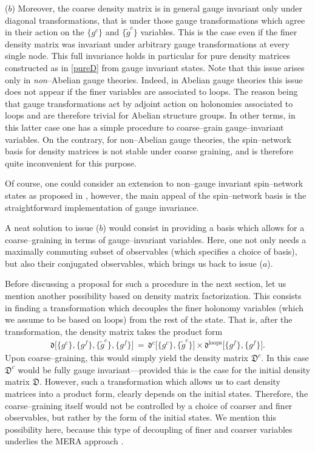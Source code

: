 \documentclass[nofootinbib,superscriptaddress,eqsecnum,tightenlines,11pt]{revtex4-1}
\def\ba{\begin{eqnarray}}
\def\ea{\end{eqnarray}}
\renewcommand{\tilde}{\widetilde}
\def\D{\mathfrak{D}}
\begin{document}
($b$) Moreover, the coarse density matrix is in general gauge invariant only under diagonal transformations, that is under those gauge transformations which agree in their action on the $\{g^c\}$ and $\{\tilde g^c\}$ variables. 
This is the  case even if the finer density matrix was invariant under arbitrary gauge transformations at every single node. 
This full invariance holds in particular for pure density matrices constructed as in \eqref{pureD} from gauge invariant states. 
Note that this issue arises only in \textit{non}--Abelian gauge theories.
Indeed, in Abelian gauge theories this issue does not appear if the finer variables are associated to loops. 
The reason being that gauge transformations  act by adjoint action on holonomies associated to loops and are therefore trivial for Abelian structure groups. 
In other terms, in this latter case one has a simple procedure to coarse--grain gauge--invariant variables.
On the contrary, for non--Abelian gauge theories, the spin--network basis for density matrices is not stable under coarse graining, and is therefore quite inconvenient for this purpose.

Of course, one could consider an extension to non--gauge invariant spin--network states as proposed in \cite{EteraCG,EteraTags}, however, the main appeal of the spin--network basis is the straightforward implementation of gauge invariance. 
 
A neat solution to issue ($b$) would consist in providing a basis which allows for a coarse--graining in terms of gauge--invariant variables. Here, one not only needs a maximally commuting subset of observables (which specifies a choice of basis), but also their conjugated observables, which brings us back to issue ($a$). 

 

  
Before discussing a proposal for such a procedure in the next section, let us mention another possibility based on density matrix factorization.
This consists in finding a transformation which decouples the finer holonomy variables (which we assume to be based on loops) from the rest of the state. 
That is, after the transformation, the density matrix takes the product form
\ba
\mathfrak{d}\Big[ \{g^c\}, \{g^f\}, \{\tilde g^c\}, \{g^f\} \Big] \,=\,  \mathfrak{d}^c \Big[ \{g^c\},  \{\tilde g^c\}\Big]  \times \mathfrak{d}^\text{loops}\Big[\{g^f\},\{g^f\}\Big] .
\ea
Upon coarse--graining, this would simply yield the density matrix $\D^c$. 
In this case $\D^c$ would be fully gauge invariant---provided this is the case for the initial density matrix $\D$. 
However, such a transformation which allows us to cast density matrices into a product form, clearly depends on the initial states. 
Therefore, the coarse--graining itself would not be controlled by a choice of coarser and finer observables, but rather by the form of the initial states. 
We mention this possibility here, because this type of decoupling of finer and coarser variables underlies the MERA approach \cite{VidalM}. 
\end{document}
